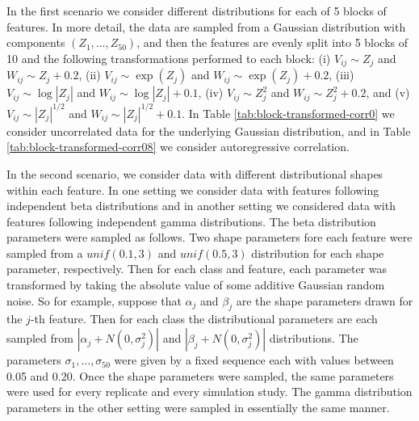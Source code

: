 In the first scenario we consider different distributions for each of 5 blocks
of features.  In more detail, the data are sampled from a Gaussian distribution
with components $(Z_1, \dots, Z_{50})$, and then the features are evenly split
into 5 blocks of 10 and the following transformations performed to each block:
(i) $V_{ij} \sim Z_j$ and $W_{ij} \sim Z_j + 0.2$, (ii) $V_{ij} \sim \exp(Z_j)$
and $W_{ij} \sim \exp(Z_j) + 0.2$, (iii) $V_{ij} \sim \log |Z_j|$ and
$W_{ij} \sim \log |Z_j| + 0.1$, (iv) $V_{ij} \sim Z_j^2$ and
$W_{ij} \sim Z_j^2 + 0.2$, and (v) $V_{ij} \sim |Z_j|^{1/2}$ and
$W_{ij} \sim |Z_j|^{1/2} + 0.1$.  In Table \ref{tab:block-transformed-corr0} we
consider uncorrelated data for the underlying Gaussian distribution, and in
Table \ref{tab:block-transformed-corr08} we consider autoregressive correlation.

In the second scenario, we consider data with different distributional shapes
within each feature.  In one setting we consider data with features following
independent beta distributions and in another setting we considered data with
features following independent gamma distributions.  The beta distribution
parameters were sampled as follows.  Two shape parameters fore each feature were
sampled from a $\mathit{unif}(0.1, 3)$ and $\mathit{unif}(0.5, 3)$ distribution
for each shape parameter, respectively.  Then for each class and feature, each
parameter was transformed by taking the absolute value of some additive Gaussian
random noise.  So for example, suppose that $\alpha_j$ and $\beta_j$ are the
shape parameters drawn for the $j$-th feature.  Then for each class the
distributional parameters are each sampled from $|\alpha_j + N(0, \sigma_j^2)|$
and $|\beta_j + N(0, \sigma_j^2)|$ distributions.  The parameters
$\sigma_1, \dots, \sigma_{50}$ were given by a fixed sequence each with values
between 0.05 and 0.20.  Once the shape parameters were sampled, the same
parameters were used for every replicate and every simulation study.  The gamma
distribution parameters in the other setting were sampled in essentially the
same manner.

